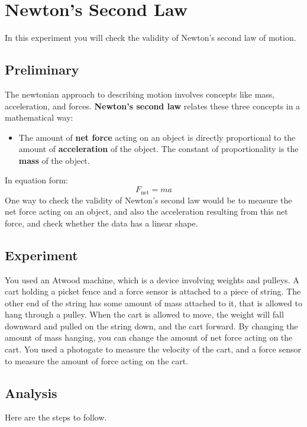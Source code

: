 \setcounter{chapter}{3}
\chapter{Newton's Second Law}
%
In this experiment you will check the validity of Newton's second law of motion.
%
\section{Preliminary}
%
The newtonian approach to describing motion involves concepts like mass, acceleration, and forces. \textbf{Newton's second law} relates these three concepts in a mathematical way:
\begin{itemize}
    \item The amount of \textbf{net force} acting on an object is directly proportional to the amount of \textbf{acceleration} of the object. The constant of proportionality is the \textbf{mass} of the object.
\end{itemize}
In equation form:
\begin{equation}
    F_{\text{net}} = m a
    \label{eq:04.Fma}
\end{equation}
One way to check the validity of Newton's second law would be to measure the net force acting on an object, and also the acceleration resulting from this net force, and check whether the data has a linear shape.
%
\section{Experiment}
%
You used an Atwood machine, which is a device involving weights and pulleys. A cart holding a picket fence and a force sensor is attached to a piece of string. The other end of the string has some amount of mass attached to it, that is allowed to hang through a pulley. When the cart is allowed to move, the weight will fall downward and pulled on the string down, and the cart forward. By changing the amount of mass hanging, you can change the amount of net force acting on the cart. You used a photogate to measure the velocity of the cart, and a force sensor to measure the amount of force acting on the cart.
%
\section{Analysis}
%
Here are the steps to follow.
%

